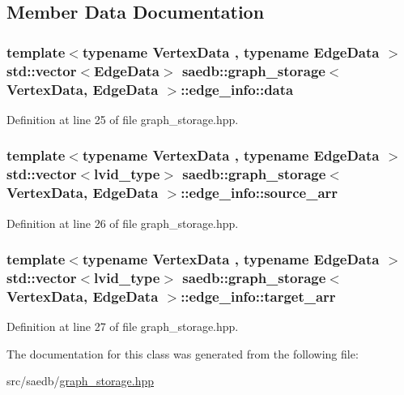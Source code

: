 \subsection{Member Data Documentation}
\hypertarget{classsaedb_1_1graph__storage_1_1edge__info_a89cef81db49ddcf298a96752a3d3740a}{
\subsubsection[{data}]{\setlength{\rightskip}{0pt plus 5cm}template$<$typename Vertex\-Data , typename Edge\-Data $>$ std\-::vector$<$Edge\-Data$>$ {\bf saedb\-::graph\-\_\-storage}$<$ Vertex\-Data, Edge\-Data $>$\-::edge\-\_\-info\-::data}}\label{da/d12/classsaedb_1_1graph__storage_1_1edge__info_a89cef81db49ddcf298a96752a3d3740a}


Definition at line 25 of file graph\-\_\-storage.\-hpp.

\hypertarget{classsaedb_1_1graph__storage_1_1edge__info_a0fc2e3ebc1bc17e51d42473155f05cfb}{
\subsubsection[{source\-\_\-arr}]{\setlength{\rightskip}{0pt plus 5cm}template$<$typename Vertex\-Data , typename Edge\-Data $>$ std\-::vector$<${\bf lvid\-\_\-type}$>$ {\bf saedb\-::graph\-\_\-storage}$<$ Vertex\-Data, Edge\-Data $>$\-::edge\-\_\-info\-::source\-\_\-arr}}\label{da/d12/classsaedb_1_1graph__storage_1_1edge__info_a0fc2e3ebc1bc17e51d42473155f05cfb}


Definition at line 26 of file graph\-\_\-storage.\-hpp.

\hypertarget{classsaedb_1_1graph__storage_1_1edge__info_a02ff602b64457dfe61471b55a2183fe0}{
\subsubsection[{target\-\_\-arr}]{\setlength{\rightskip}{0pt plus 5cm}template$<$typename Vertex\-Data , typename Edge\-Data $>$ std\-::vector$<${\bf lvid\-\_\-type}$>$ {\bf saedb\-::graph\-\_\-storage}$<$ Vertex\-Data, Edge\-Data $>$\-::edge\-\_\-info\-::target\-\_\-arr}}\label{da/d12/classsaedb_1_1graph__storage_1_1edge__info_a02ff602b64457dfe61471b55a2183fe0}


Definition at line 27 of file graph\-\_\-storage.\-hpp.



The documentation for this class was generated from the following file\-:\begin{DoxyCompactItemize}
\item 
src/saedb/\hyperlink{graph__storage_8hpp}{graph\-\_\-storage.\-hpp}\end{DoxyCompactItemize}
